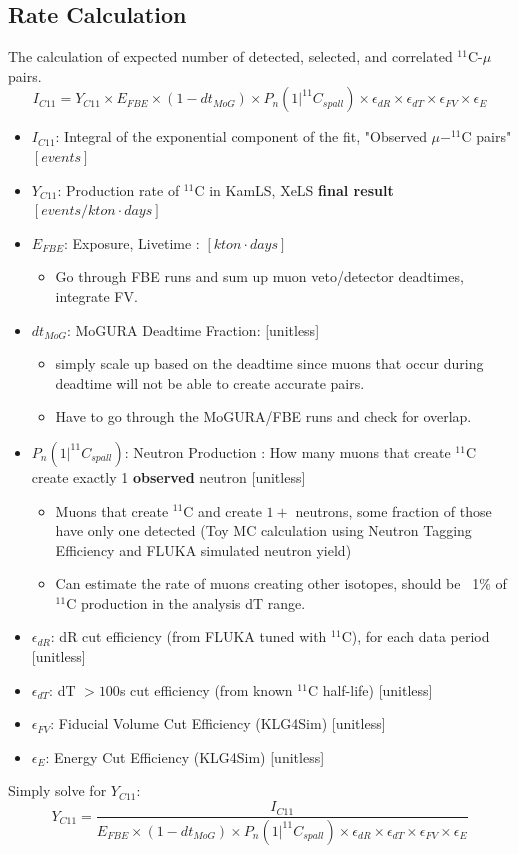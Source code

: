 \documentclass[12pt,letterpaper]{article}
\begin{document}
\subsection*{Rate Calculation}
The calculation of expected number of detected, selected, and correlated $^{11}$C-$\mu$ pairs.
\begin{equation}
	I_{C11} = Y_{C11}\times E_{FBE} \times (1-dt_{MoG}) \times P_n(1|^{11}C_{spall}) \times \epsilon_{dR} \times \epsilon_{dT} \times \epsilon_{FV} \times \epsilon_{E}
\end{equation}
\begin{itemize}
	\item $I_{C11}$: Integral of the exponential component of the fit, "Observed $\mu-^{11}$C pairs" $[events]$
	\item $Y_{C11}$: Production rate of $^{11}$C in KamLS, XeLS \textbf{final result} $[events/kton\cdot days]$
	\item $E_{FBE}$: Exposure, Livetime : $[kton\cdot days]$
	\begin{itemize}
		\item Go through FBE runs and sum up muon veto/detector deadtimes, integrate FV.
	\end{itemize}
	\item $dt_{MoG}$: MoGURA Deadtime Fraction: [unitless]
	\begin{itemize}
		\item simply scale up based on the deadtime since muons that occur during deadtime will not be able to create accurate pairs.
		\item Have to go through the MoGURA/FBE runs and check for overlap.
	\end{itemize}
	\item $P_n(1|^{11}C_{spall})$: Neutron Production : How many muons that create $^{11}$C create exactly 1 \textbf{observed} neutron [unitless]
	\begin{itemize}
		\item Muons that create $^{11}$C and create $1+$ neutrons, some fraction of those have only one detected (Toy MC calculation using Neutron Tagging Efficiency and FLUKA simulated neutron yield)
		\item Can estimate the rate of muons creating other isotopes, should be ~1\% of $^{11}$C production in the analysis dT range.
	\end{itemize}
	\item $\epsilon_{dR}$: dR cut efficiency (from FLUKA tuned with $^{11}$C), for each data period [unitless]
	\item $\epsilon_{dT}$: dT $>100$s cut efficiency (from known $^{11}$C half-life) [unitless]
	\item $\epsilon_{FV}$: Fiducial Volume Cut Efficiency (KLG4Sim) [unitless]
	\item $\epsilon_{E}$: Energy Cut Efficiency (KLG4Sim) [unitless]
\end{itemize}
Simply solve for $Y_{C11}$:
\begin{equation}
	Y_{C11} = \frac{I_{C11}}{E_{FBE} \times (1-dt_{MoG}) \times P_n(1|^{11}C_{spall}) \times \epsilon_{dR} \times \epsilon_{dT} \times \epsilon_{FV} \times \epsilon_{E}}
\end{equation}
\end{document}
